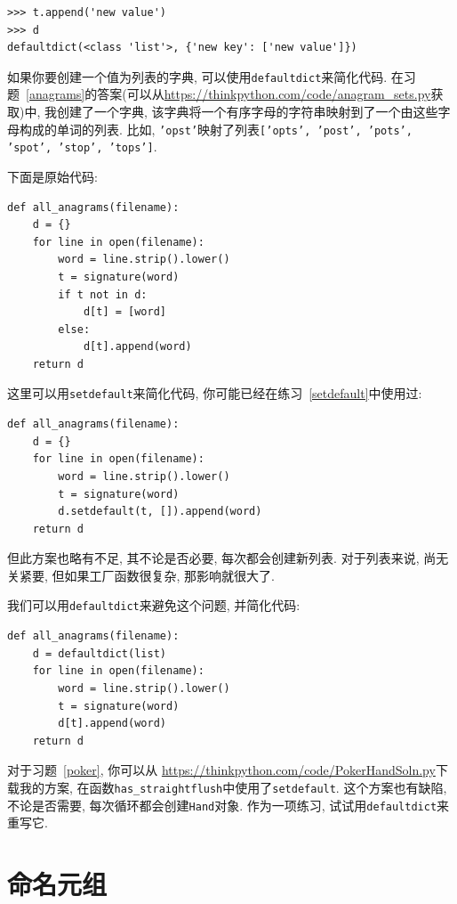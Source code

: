 \documentclass[10pt]{book}
\begin{document}
\begin{verbatim}
>>> t.append('new value')
>>> d
defaultdict(<class 'list'>, {'new key': ['new value']})
\end{verbatim}

如果你要创建一个值为列表的字典, 可以使用{\tt defaultdict}来简化代码. 
在习题~\ref{anagrams}的答案(可以从\url{https://thinkpython.com/code/anagram_sets.py}获取)中, 
我创建了一个字典, 该字典将一个有序字母的字符串映射到了一个由这些字母构成的单词的列表. 
比如, {\tt 'opst'}映射了列表{\tt ['opts', 'post', 'pots', 'spot', 'stop', 'tops']}.

下面是原始代码:

\begin{verbatim}
def all_anagrams(filename):
    d = {}
    for line in open(filename):
        word = line.strip().lower()
        t = signature(word)
        if t not in d:
            d[t] = [word]
        else:
            d[t].append(word)
    return d
\end{verbatim}

这里可以用{\tt setdefault}来简化代码, 你可能已经在练习~\ref{setdefault}中使用过:

\begin{verbatim}
def all_anagrams(filename):
    d = {}
    for line in open(filename):
        word = line.strip().lower()
        t = signature(word)
        d.setdefault(t, []).append(word)
    return d
\end{verbatim}

但此方案也略有不足, 其不论是否必要, 每次都会创建新列表. 
对于列表来说, 尚无关紧要, 但如果工厂函数很复杂, 
那影响就很大了. 

我们可以用{\tt defaultdict}来避免这个问题, 并简化代码:

\begin{verbatim}
def all_anagrams(filename):
    d = defaultdict(list)
    for line in open(filename):
        word = line.strip().lower()
        t = signature(word)
        d[t].append(word)
    return d
\end{verbatim}

对于习题~\ref{poker}, 你可以从
\url{https://thinkpython.com/code/PokerHandSoln.py}下载我的方案, 
在函数\verb"has_straightflush"中使用了{\tt setdefault}. 
这个方案也有缺陷, 不论是否需要, 每次循环都会创建{\tt Hand}对象. 
作为一项练习, 试试用{\tt defaultdict}来重写它. 


\section{命名元组}
\label{Named tuples}
\end{document}
